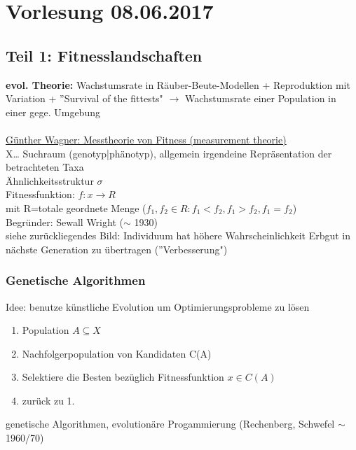 \section{Vorlesung 08.06.2017}

\subsection{Teil 1: Fitnesslandschaften}

\textbf{evol. Theorie:} Wachstumsrate in Räuber-Beute-Modellen + Reproduktion mit Variation + ''Survival of the fittests" $\rightarrow$ Wachstumsrate einer Population in einer gege. Umgebung
\\\\
\underline{Günther Wagner: Messtheorie von Fitness (measurement theorie)}
\\

X… Suchraum (genotyp|phänotyp), allgemein irgendeine Repräsentation der betrachteten Taxa
\\
Ähnlichkeitsstruktur $\sigma$\\
Fitnessfunktion: $f:x \rightarrow R$\\
mit R=totale geordnete Menge ($f_1, f_2 \in R: f_1 < f_2, f_1 > f_2, f_1 = f_2$)
\\


Begründer: Sewall Wright ($\sim$ 1930)\\
siehe zurückliegendes Bild: Individuum hat höhere Wahrscheinlichkeit Erbgut in nächste Generation zu übertragen (''Verbesserung")\\

\subsubsection{Genetische Algorithmen}
Idee: benutze künstliche Evolution um Optimierungsprobleme zu lösen

\begin{enumerate}
	\item Population $A \subseteq X$
	\item Nachfolgerpopulation von Kandidaten C(A)
	\item Selektiere die Besten bezüglich Fitnessfunktion $x \in C(A)$
	\item zurück zu 1.
\end{enumerate}

genetische Algorithmen, evolutionäre Progammierung (Rechenberg, Schwefel $\sim$ 1960/70)\\


